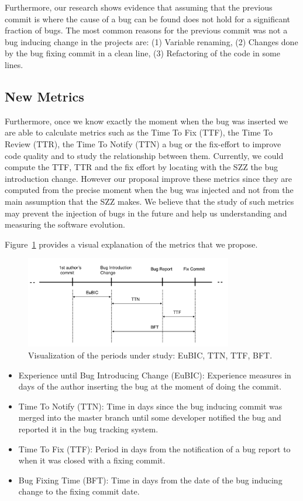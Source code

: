 \documentclass[a4paper]{article}
\begin{document}
Furthermore, our research shows evidence that assuming that the previous commit is where the cause of a bug can be found does not hold for a significant fraction of bugs. The most common reasons for the previous commit was not a bug inducing change in the projects are: (1) Variable renaming, (2) Changes done by the bug fixing commit in a clean line, (3) Refactoring of the code in some lines.

\subsection{New Metrics}

Furthermore, once we know exactly the moment when the bug was inserted we are able to calculate metrics such as the Time To Fix (TTF), the Time To Review (TTR), the Time To Notify (TTN) a bug or the fix-effort to improve code quality and to study the relationship between them. Currently, we could compute the TTF, TTR and the fix effort by locating with the SZZ the bug introduction change. However our proposal improve these metrics since they are computed from the precise moment when the bug was injected and not from the main assumption that the SZZ makes. We believe that the study of such metrics may prevent the injection of bugs in the future and help us understanding and measuring the software evolution.

Figure~\ref{fig:metrics} provides a visual explanation of the metrics that we propose.

\begin{figure}[ht]
\centering
\includegraphics[height=4cm]{metrics.png}
\caption{Visualization of the periods under study: EuBIC, TTN, TTF, BFT.}
\label{fig:metrics}       %
\end{figure}

\begin{itemize}
\item{Experience until Bug Introducing Change (EuBIC):}
Experience measures in days of the author inserting the bug at the moment of doing the commit. 
\item{Time To Notify (TTN):}
Time in days since the bug inducing commit was merged into the master branch until some developer notified the bug and reported it in the bug tracking system. 
\item{Time To Fix (TTF):}
Period in days from the notification of a bug report to when it was closed with a fixing commit.
\item{Bug Fixing Time (BFT):}
Time in days from the date of the bug inducing change to the fixing commit date.
\end{itemize}
\end{document}
